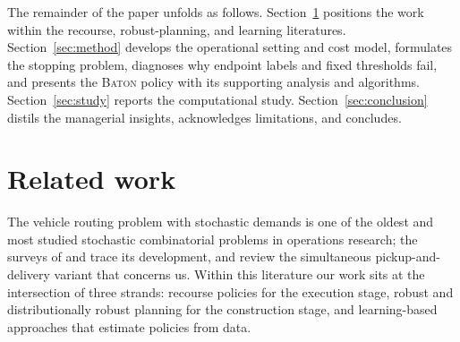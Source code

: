 \documentclass[preprint,authoryear,12pt]{elsarticle}
\theoremstyle{definition}
\theoremstyle{remark}
\begin{document}
The remainder of the paper unfolds as follows.
Section~\ref{sec:related} positions the work within the recourse,
robust-planning, and learning literatures.
Section~\ref{sec:method} develops the operational setting and cost
model, formulates the stopping problem, diagnoses why endpoint labels
and fixed thresholds fail, and presents the \textsc{Baton} policy with
its supporting analysis and algorithms. Section~\ref{sec:study} reports
the computational study. Section~\ref{sec:conclusion} distils the
managerial insights, acknowledges limitations, and concludes.


\section{Related work}\label{sec:related}

The vehicle routing problem with stochastic demands is one of the oldest
and most studied stochastic combinatorial problems in operations
research; the surveys of \citet{gendreau1996stochastic} and
\citet{oyola2018stochastic} trace its development, and
\citet{koc2020review} review the simultaneous pickup-and-delivery
variant that concerns us. Within this literature our work sits at the
intersection of three strands: recourse policies for the execution
stage, robust and distributionally robust planning for the construction
stage, and learning-based approaches that estimate policies from data.
\end{document}
